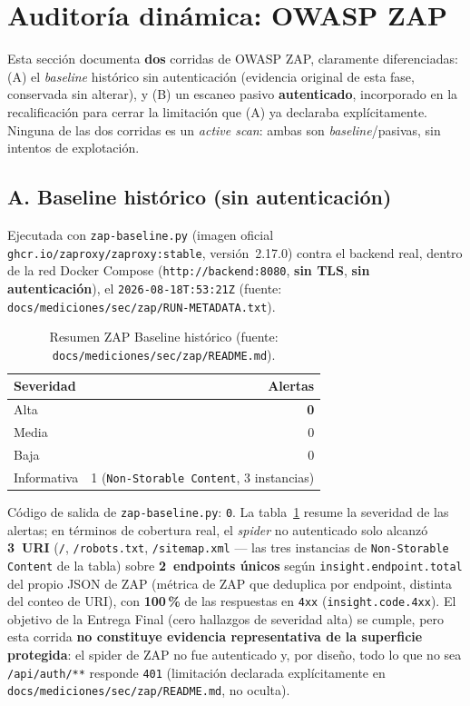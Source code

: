 \section{Auditor\'ia din\'amica: OWASP ZAP}
\label{sec:zap}

Esta secci\'on documenta \textbf{dos} corridas de OWASP ZAP, claramente
diferenciadas: (A) el \emph{baseline} hist\'orico sin autenticaci\'on
(evidencia original de esta fase, conservada sin alterar), y (B) un
escaneo pasivo \textbf{autenticado}, incorporado en la recalificaci\'on
para cerrar la limitaci\'on que (A) ya declaraba expl\'icitamente. Ninguna
de las dos corridas es un \emph{active scan}: ambas son \emph{baseline}/pasivas,
sin intentos de explotaci\'on.

\subsection{A. Baseline hist\'orico (sin autenticaci\'on)}
\label{sec:zap-baseline-historico}

Ejecutada con \texttt{zap-baseline.py} (imagen oficial
\texttt{ghcr.io/zaproxy/zaproxy:stable}, versi\'on~2.17.0) contra el
backend real, dentro de la red Docker Compose (\texttt{http://\allowbreak backend:8080},
\textbf{sin TLS}, \textbf{sin autenticaci\'on}), el
\texttt{2026-08-18T:53:21Z} (fuente:
\texttt{docs/mediciones/sec/zap/RUN-METADATA.txt}).

\begin{table}[H]
  \centering
  \caption[Resumen ZAP Baseline hist\'orico.]{Resumen ZAP Baseline hist\'orico (fuente: \texttt{docs/mediciones/sec/zap/README.md}).}
  \label{tab:zap-final}
  \begin{tabular}{@{}lr@{}}
    \toprule
    Severidad & Alertas \\
    \midrule
    Alta & \textbf{0} \\
    Media & 0 \\
    Baja & 0 \\
    Informativa & 1 (\texttt{Non-Storable Content}, 3 instancias) \\
    \bottomrule
  \end{tabular}
\end{table}

C\'odigo de salida de \texttt{zap-baseline.py}: \texttt{0}. La
tabla~\ref{tab:zap-final} resume la severidad de las alertas; en t\'erminos
de cobertura real, el \emph{spider} no autenticado solo alcanz\'o
\textbf{3~URI} (\texttt{/}, \texttt{/robots.txt}, \texttt{/sitemap.xml} ---
las tres instancias de \texttt{Non-Storable Content} de la tabla) sobre
\textbf{2~endpoints \'unicos} seg\'un \texttt{insight.endpoint.total} del
propio JSON de ZAP (m\'etrica de ZAP que deduplica por endpoint, distinta
del conteo de URI), con \textbf{100\,\%} de las respuestas en \texttt{4xx}
(\texttt{insight.code.4xx}). El objetivo de la Entrega Final (cero
hallazgos de severidad alta) se cumple, pero esta corrida \textbf{no
constituye evidencia representativa de la superficie protegida}: el
spider de ZAP no fue autenticado y, por dise\~no, todo lo que no sea
\texttt{/api/auth/**} responde \texttt{401} (limitaci\'on declarada
expl\'icitamente en \texttt{docs/mediciones/sec/zap/README.md}, no
oculta).

